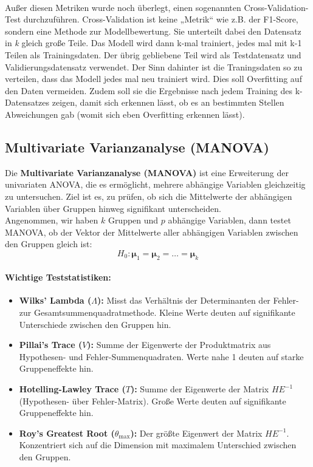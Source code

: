 \documentclass[a4paper,12pt]{article}
\begin{document}
	\\[0.5em]
	Außer diesen Metriken wurde noch überlegt, einen sogenannten Cross-Validation-Test durchzuführen. Cross-Validation ist keine „Metrik“ wie z.B. der F1-Score, sondern eine Methode zur Modellbewertung. Sie unterteilt dabei den Datensatz in \textit{k} gleich große Teile. Das Modell wird dann k-mal trainiert, jedes mal mit k-1 Teilen als Trainingsdaten. Der übrig gebliebene Teil wird als Testdatensatz und Validierungsdatensatz verwendet. Der Sinn dahinter ist die Traningsdaten so zu verteilen, dass das Modell jedes mal neu trainiert wird. Dies soll Overfitting auf den Daten vermeiden. Zudem soll sie die Ergebnisse nach jedem Training des k-Datensatzes zeigen, damit sich erkennen lässt, ob es an bestimmten Stellen Abweichungen gab
	(womit sich eben Overfitting erkennen lässt).
	
	\subsection{Multivariate Varianzanalyse (MANOVA)}
	Die \textbf{Multivariate Varianzanalyse (MANOVA)} ist eine Erweiterung der univariaten ANOVA, die es ermöglicht, mehrere abhängige Variablen gleichzeitig zu untersuchen. Ziel ist es, zu prüfen, ob sich die Mittelwerte der abhängigen Variablen über Gruppen hinweg signifikant unterscheiden.
	\\[0.5em]
	Angenommen, wir haben $k$ Gruppen und $p$ abhängige Variablen, dann testet MANOVA, ob der Vektor der Mittelwerte aller abhängigen Variablen zwischen den Gruppen gleich ist:
	\[
	H_0: \boldsymbol{\mu}_1 = \boldsymbol{\mu}_2 = \dots = \boldsymbol{\mu}_k
	\]
	
	\paragraph{Wichtige Teststatistiken:}
	\begin{itemize}
		\item \textbf{Wilks' Lambda ($\Lambda$):} Misst das Verhältnis der Determinanten der Fehler- zur Gesamtsummenquadratmethode. Kleine Werte deuten auf signifikante Unterschiede zwischen den Gruppen hin.
		\item \textbf{Pillai's Trace ($V$):} Summe der Eigenwerte der Produktmatrix aus Hypothesen- und Fehler-Summenquadraten. Werte nahe 1 deuten auf starke Gruppeneffekte hin.
		\item \textbf{Hotelling-Lawley Trace ($T$):} Summe der Eigenwerte der Matrix $H E^{-1}$ (Hypothesen- über Fehler-Matrix). Große Werte deuten auf signifikante Gruppeneffekte hin.
		\item \textbf{Roy's Greatest Root ($\theta_\text{max}$):} Der größte Eigenwert der Matrix $H E^{-1}$. Konzentriert sich auf die Dimension mit maximalem Unterschied zwischen den Gruppen.
	\end{itemize}
	
\end{document}
